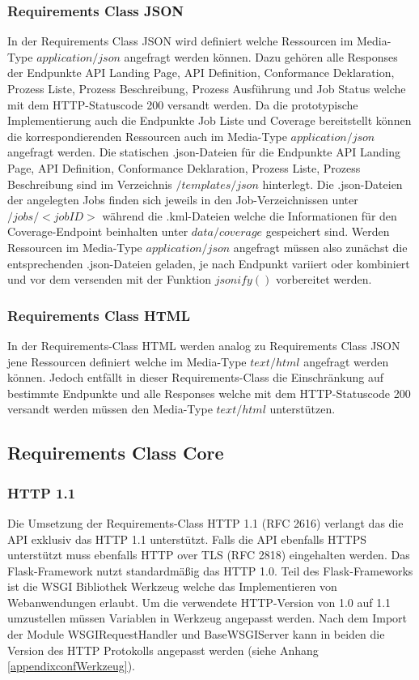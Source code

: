 \subsubsection{Requirements Class JSON}
In der Requirements Class JSON wird definiert welche Ressourcen im Media-Type $application/json$ angefragt werden können. Dazu gehören alle Responses der 
Endpunkte API Landing Page, API Definition, Conformance Deklaration, Prozess Liste, Prozess Beschreibung, Prozess Ausführung und Job Status welche mit dem 
HTTP-Statuscode 200 versandt werden. Da die prototypische Implementierung auch die Endpunkte Job Liste und Coverage bereitstellt können die korrespondierenden
Ressourcen auch im Media-Type $application/json$ angefragt werden.
Die statischen .json-Dateien für die Endpunkte API Landing Page, API Definition, Conformance Deklaration, Prozess Liste, Prozess Beschreibung sind im Verzeichnis
$/templates/json$ hinterlegt. Die .json-Dateien der angelegten Jobs finden sich jeweils in den Job-Verzeichnissen unter $/jobs/<jobID>$ während die .kml-Dateien
welche die Informationen für den Coverage-Endpoint beinhalten unter $data/coverage$ gespeichert sind. Werden Ressourcen im Media-Type $application/json$ angefragt
müssen also zunächst die entsprechenden .json-Dateien geladen, je nach Endpunkt variiert oder kombiniert und vor dem versenden mit der Funktion $jsonify()$
vorbereitet werden. 

\subsubsection{Requirements Class HTML}
In der Requirements-Class HTML werden analog zu Requirements Class JSON jene Ressourcen definiert welche im Media-Type $text/html$ angefragt werden können. Jedoch
entfällt in dieser Requirements-Class die Einschränkung auf bestimmte Endpunkte und alle Responses welche mit dem HTTP-Statuscode 200 versandt werden müssen den 
Media-Type $text/html$ unterstützen. 

\subsection{Requirements Class Core}
\subsubsection{HTTP 1.1}
Die Umsetzung der Requirements-Class HTTP 1.1 (RFC 2616) verlangt das die API exklusiv das HTTP 1.1 unterstützt. 
Falls die API ebenfalls HTTPS unterstützt muss ebenfalls HTTP over TLS (RFC 2818) eingehalten werden. 
Das Flask-Framework nutzt standardmäßig das HTTP 1.0. Teil des Flask-Frameworks ist die WSGI Bibliothek Werkzeug welche
das Implementieren von Webanwendungen erlaubt. Um die verwendete HTTP-Version von 1.0 auf 1.1 umzustellen müssen Variablen 
in Werkzeug angepasst werden. Nach dem Import der Module WSGIRequestHandler und BaseWSGIServer kann in beiden die 
Version des HTTP Protokolls angepasst werden (siehe Anhang \ref{appendixconfWerkzeug}). 

